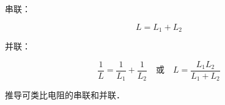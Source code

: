 
\begin{issues}
\issueDraft
\end{issues}


串联：

\begin{equation}
L = L_1 + L_2
\end{equation}

并联：

\begin{equation}
\frac{1}{L} = \frac{1}{L_1} + \frac{1}{L_2}
\quad \text{或} \quad
L = \frac{L_1L_2}{L_1 + L_2}
\end{equation}

推导可类比电阻的串联和并联．
